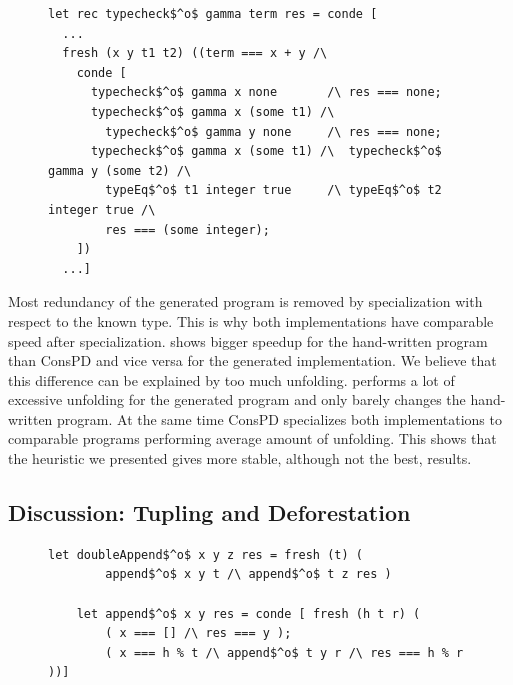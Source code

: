 \begin{figure}[!t]
  \centering
    \begin{lstlisting}[label={type:gen}, caption={A fragment of the generated typechecker}, captionpos=b, frame=tb]
let rec typecheck$^o$ gamma term res = conde [
  ...
  fresh (x y t1 t2) ((term === x + y /\
    conde [
      typecheck$^o$ gamma x none       /\ res === none;
      typecheck$^o$ gamma x (some t1) /\
        typecheck$^o$ gamma y none     /\ res === none;
      typecheck$^o$ gamma x (some t1) /\  typecheck$^o$ gamma y (some t2) /\
        typeEq$^o$ t1 integer true     /\ typeEq$^o$ t2 integer true /\
        res === (some integer);
    ])
  ...]
    \end{lstlisting}
\end{figure}

Most redundancy of the generated program is removed by specialization with respect to the known type.
This is why both implementations have comparable speed after specialization.
\ecce shows bigger speedup for the hand-written program than ConsPD and vice versa for the generated implementation.
We believe that this difference can be explained by too much unfolding.
\ecce performs a lot of excessive unfolding for the generated program and only barely changes the hand-written program.
At the same time ConsPD specializes both implementations to comparable programs performing average amount of unfolding.
This shows that the heuristic we presented gives more stable, although not the best, results.


\subsection{Discussion: Tupling and Deforestation}
\label{discussion}


\begin{figure}[!t]
  \centering
  \begin{minipage}{0.7\textwidth}
    \begin{lstlisting}[label={doubleApp}, caption={Inefficient implementation of concatenation of three lists}, captionpos=b, frame=tb]
    let doubleAppend$^o$ x y z res = fresh (t) (
        append$^o$ x y t /\ append$^o$ t z res )

    let append$^o$ x y res = conde [ fresh (h t r) (
        ( x === [] /\ res === y );
        ( x === h % t /\ append$^o$ t y r /\ res === h % r ))]
    \end{lstlisting}
  \end{minipage}
\end{figure}


